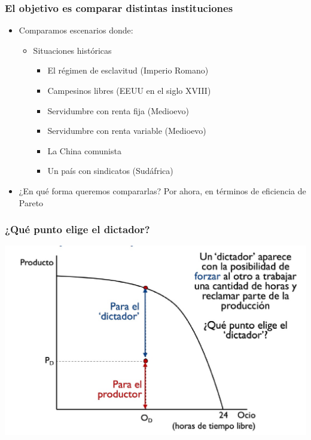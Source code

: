 \documentclass{beamer}
\begin{document}
\begin{frame}
\frametitle{El objetivo es comparar distintas instituciones}
\begin{itemize}
        \item Comparamos escenarios donde:\vspace{2mm}
            \begin{itemize}
            \item Situaciones históricas\vspace{2mm}
            \begin{itemize}
            \item El régimen de esclavitud (Imperio Romano)\vspace{2mm}
            \item Campesinos libres (EEUU en el siglo XVIII)\vspace{2mm}
            \item Servidumbre con renta fija (Medioevo)\vspace{2mm}
            \item Servidumbre con renta variable (Medioevo)\vspace{2mm}
            \item La China comunista \vspace{2mm}
            \item Un país con sindicatos (Sudáfrica)\vspace{2mm}
            \end{itemize}
        \end{itemize}\vspace{4mm}
    \item ¿En qué forma queremos compararlas? Por ahora, en términos de eficiencia de Pareto
\end{itemize}
\end{frame}

\begin{frame}
\frametitle{¿Qué punto elige el dictador?}
\centering
\includegraphics[scale=0.4]{Slides Principios de Economia/Figures/Tema_04.7_modcap4_2.jpg}\end{frame}
\end{document}
